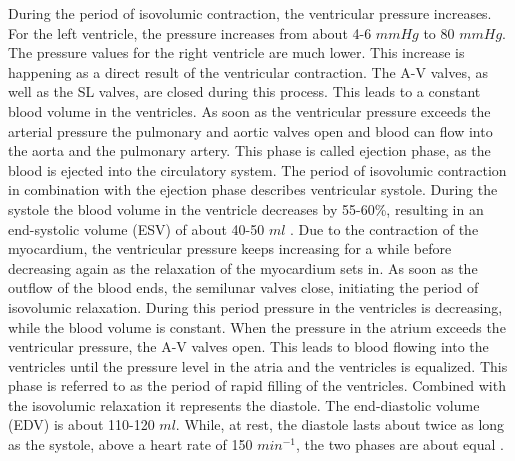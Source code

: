 During the period of isovolumic contraction, the ventricular pressure increases. For the left ventricle, the pressure increases from about 4-6 $mmHg$ to 80 $mmHg$. The pressure values for the right ventricle are much lower. This increase is happening as a direct result of the ventricular contraction. The A-V valves, as well as the SL valves, are closed during this process. This leads to a constant blood volume in the ventricles. As soon as the ventricular pressure exceeds the arterial pressure the pulmonary and aortic valves open and blood can flow into the aorta and the pulmonary artery. This phase is called ejection phase, as the blood is ejected into the circulatory system. The period of isovolumic contraction in combination with the ejection phase describes ventricular systole. \cite{HKS4} During the systole the blood volume in the ventricle decreases by 55-60\%, resulting in an end-systolic volume (ESV) of about 40-50 $ml$ \cite{GH20}. Due to the contraction of the myocardium, the ventricular pressure keeps increasing for a while before decreasing again as the relaxation of the myocardium sets in. As soon as the outflow of the blood ends, the semilunar valves close, initiating the period of isovolumic relaxation. During this period pressure in the ventricles is decreasing, while the blood volume is constant. When the pressure in the atrium exceeds the ventricular pressure, the A-V valves open. This leads to blood flowing into the ventricles until the pressure level in the atria and the ventricles is equalized. \cite{HKS4} This phase is referred to as the period of rapid filling of the ventricles. Combined with the isovolumic relaxation it represents the diastole. The end-diastolic volume (EDV) is about 110-120 $ml$. \cite{GH20} While, at rest, the diastole lasts about twice as long as the systole, above a heart rate of 150 $min^{-1}$, the two phases are about equal \cite{HKS4}.

